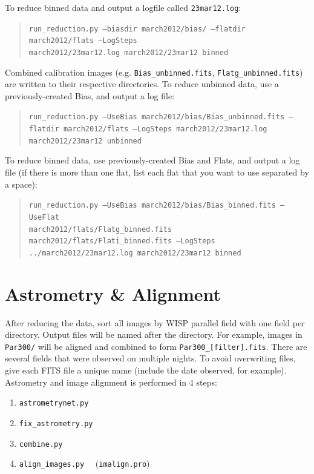 \documentclass{article}
\newlength{\wideitemsep}
\let\olditem\item
\renewcommand{\item}{\setlength{\itemsep}{\wideitemsep}\olditem}
\begin{document}
\noindent To reduce binned data and output a logfile called 
\texttt{23mar12.log}:

\begin{quote}
\texttt{run\_reduction.py --biasdir march2012/bias/ --flatdir march2012/flats 
--LogSteps \\
march2012/23mar12.log march2012/23mar12 binned}
\end{quote}

\noindent Combined calibration images (e.g. \texttt{Bias\_unbinned.fits},
\texttt{Flatg\_unbinned.fits}) are written to their respective directories.
To reduce unbinned data, use a previously-created Bias, and output
a log file:
\begin{quote}
\texttt{run\_reduction.py --UseBias march2012/bias/Bias\_unbinned.fits --flatdir 
march2012/flats --LogSteps march2012/23mar12.log march2012/23mar12 unbinned} \\
\end{quote}

\noindent To reduce binned data, use previously-created Bias and Flats,
and output a log file (if there is more than one flat, list each flat that 
you want to use separated by a space):
\begin{quote}
\texttt{run\_reduction.py --UseBias march2012/bias/Bias\_binned.fits --UseFlat \\
march2012/flats/Flatg\_binned.fits march2012/flats/Flati\_binned.fits 
--LogSteps\\ ../march2012/23mar12.log march2012/23mar12 binned}
\end{quote}


\vspace{3 mm}
\section{Astrometry \& Alignment}
After reducing the data, sort all images by WISP parallel field with
one field per directory. Output files will be named after the directory.
For example, images in \texttt{Par300/} will be aligned and combined
to form \texttt{Par300\_[filter].fits}.
There are several fields that were observed on multiple nights. To avoid 
overwriting files, give each FITS file a unique name 
(include the date observed, for example). \\

\noindent Astrometry and image alignment is performed in $4$ steps:
\begin{enumerate}
\item \texttt{astrometrynet.py}
\item \texttt{fix\_astrometry.py}
\item \texttt{combine.py}
\item \texttt{align\_images.py} ~~(\texttt{imalign.pro})
\end{enumerate}
\end{document}
